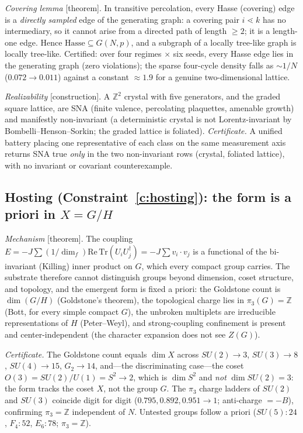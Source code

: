 \documentclass[aps,prd,reprint,nofootinbib,superscriptaddress,floatfix]{revtex4-2}
\begin{document}
\emph{Covering lemma} [theorem]. In transitive percolation, every Hasse (covering) edge is a
\emph{directly sampled} edge of the generating graph: a covering pair $i\lessdot k$ has no
intermediary, so it cannot arise from a directed path of length $\ge2$; it is a length-one edge.
Hence $\mathrm{Hasse}\subseteq G(N,p)$, and a subgraph of a locally tree-like graph is locally
tree-like. Certified: over four regimes $\times$ six seeds, every Hasse edge lies in the
generating graph (zero violations); the sparse four-cycle density falls as $\sim1/N$
($0.072\!\to\!0.011$) against a constant $\approx1.9$ for a genuine two-dimensional lattice.

\emph{Realizability} [construction]. A $\mathbb Z^2$ crystal with five generators, and the graded
square lattice, are SNA (finite valence, percolating plaquettes, amenable growth) and manifestly
non-invariant (a deterministic crystal is not Lorentz-invariant by Bombelli--Henson--Sorkin; the
graded lattice is foliated). \emph{Certificate.} A unified battery placing one representative of
each class on the same measurement axis returns SNA true \emph{only} in the two non-invariant
rows (crystal, foliated lattice), with no invariant or covariant counterexample.

\subsection{Hosting (Constraint~\ref{c:hosting}): the form is a priori in $X=G/H$}
\label{app:hosting}

\emph{Mechanism} [theorem]. The coupling $E=-J\sum(1/\dim_f)\mathrm{Re}\,\mathrm{Tr}
(U_iU_j^\dagger)=-J\sum v_i\!\cdot\!v_j$ is a functional of the bi-invariant (Killing) inner
product on $G$, which every compact group carries. The substrate therefore cannot distinguish
groups beyond dimension, coset structure, and topology, and the emergent form is fixed a priori:
the Goldstone count is $\dim(G/H)$ (Goldstone's theorem), the topological charge lies in
$\pi_3(G)=\mathbb Z$ (Bott, for every simple compact $G$), the unbroken multiplets are
irreducible representations of $H$ (Peter--Weyl), and strong-coupling confinement is present and
center-independent (the character expansion does not see $Z(G)$).

\emph{Certificate.} The Goldstone count equals $\dim X$ across $SU(2)\!\to\!3$,
$SU(3)\!\to\!8$, $SU(4)\!\to\!15$, $G_2\!\to\!14$, and---the discriminating case---the coset
$O(3)=SU(2)/U(1)=S^2\!\to\!2$, which is $\dim S^2$ and \emph{not} $\dim SU(2)=3$: the form tracks
the coset $X$, not the group $G$. The $\pi_3$ charge ladders of $SU(2)$ and $SU(3)$ coincide
digit for digit ($0.795,0.892,0.951\to1$; anti-charge $=-B$), confirming $\pi_3=\mathbb Z$
independent of $N$. Untested groups follow a priori ($SU(5)\!:\!24$, $F_4\!:\!52$, $E_6\!:\!78$;
$\pi_3=\mathbb Z$).
\end{document}
